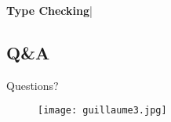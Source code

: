 \begin{frame}[fragile]{\textbf{Type Checking}}|
    \begin{example}
        
    \end{example}
\end{frame}
\subsection*{Q\&A}
\begin{frame}{Questions?}
    \begin{figure}
        \centering
        \texttt{[image: guillaume3.jpg]}
    \end{figure}
\end{frame}